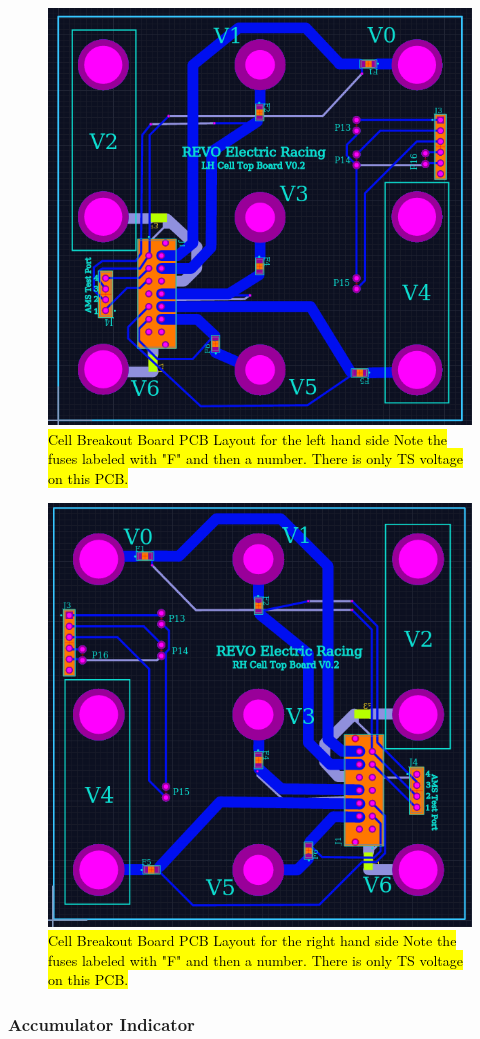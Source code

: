 \documentclass{article}
\DeclareRobustCommand{\hlr}[1]{{\sethlcolor{red}\hl{#1}}}
\begin{document}

            \begin{figure}[H]
                \centering
                \includegraphics[width = 0.4 \textwidth]{CellTopLH}
                \caption{\hlr{Cell Breakout Board PCB Layout for the left hand side Note the fuses labeled with "F" and then a number. There is only TS voltage on this PCB.}}
                \label{celltopLH}
            \end{figure}

            \begin{figure}[H]
                \centering
                \includegraphics[width = 0.4 \textwidth]{CellTopRH}
                \caption{\hlr{Cell Breakout Board PCB Layout for the right hand side Note the fuses labeled with "F" and then a number. There is only TS voltage on this PCB.}}
                \label{celltopRH}
            \end{figure}

        \subsubsection{Accumulator Indicator} \label{aindicator}

\end{document}
